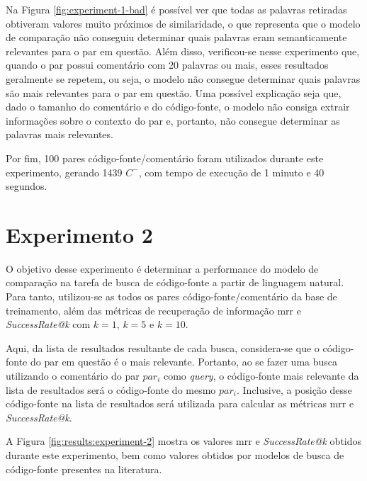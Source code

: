 Na Figura \ref{fig:experiment-1-bad} é possível ver que todas as palavras retiradas obtiveram valores muito próximos de similaridade, o que representa que o modelo de comparação não conseguiu determinar quais palavras eram semanticamente relevantes para o par em questão. Além disso, verificou-se nesse experimento que, quando o par possui comentário com 20 palavras ou mais, esses resultados geralmente se repetem, ou seja, o modelo não consegue determinar quais palavras são mais relevantes para o par em questão. Uma possível explicação seja que, dado o tamanho do comentário e do código-fonte, o modelo não consiga extrair informações sobre o contexto do par e, portanto, não consegue determinar as palavras mais relevantes.

Por fim, 100 pares código-fonte/comentário foram utilizados durante este experimento, gerando 1439 $C^-$, com tempo de execução de 1 minuto e 40 segundos.

\section{Experimento 2} 
\label{sec:results:experiment-2}
O objetivo desse experimento é determinar a performance do modelo de comparação na tarefa de busca de código-fonte a partir de linguagem natural. Para tanto, utilizou-se as todos os pares código-fonte/comentário da base de treinamento, além das métricas de recuperação de informação \gls{mrr} e \textit{SuccessRate@k} com $k=1$, $k=5$ e $k=10$.

Aqui, da lista de resultados resultante de cada busca, considera-se que o código-fonte do par em questão é o mais relevante. Portanto, ao se fazer uma busca utilizando o comentário do par $par_i$ como \textit{query}, o código-fonte mais relevante da lista de resultados será o código-fonte do mesmo $par_i$. Inclusive, a posição desse código-fonte na lista de resultados será utilizada para calcular as métricas \gls{mrr} e \textit{SuccessRate@k}.

A Figura \ref{fig:results:experiment-2} mostra os valores \gls{mrr} e \textit{SuccessRate@k} obtidos durante este experimento, bem como valores obtidos por modelos de busca de código-fonte presentes na literatura.

